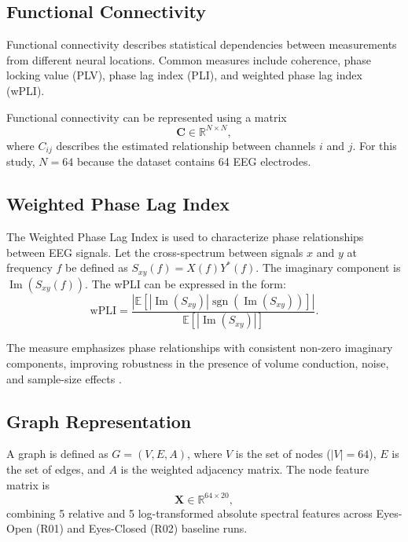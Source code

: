 \documentclass[conference]{IEEEtran}
\begin{document}
\subsection{Functional Connectivity}
Functional connectivity describes statistical dependencies between measurements from different neural locations. Common measures include coherence, phase locking value (PLV), phase lag index (PLI), and weighted phase lag index (wPLI).

Functional connectivity can be represented using a matrix
\begin{equation}
\mathbf{C} \in \mathbb{R}^{N \times N},
\end{equation}
where $C_{ij}$ describes the estimated relationship between channels $i$ and $j$. For this study, $N = 64$ because the dataset contains 64 EEG electrodes.

\subsection{Weighted Phase Lag Index}
The Weighted Phase Lag Index is used to characterize phase relationships between EEG signals. Let the cross-spectrum between signals $x$ and $y$ at frequency $f$ be defined as $S_{xy}(f) = X(f)Y^*(f)$. The imaginary component is $\operatorname{Im}(S_{xy}(f))$. The wPLI can be expressed in the form:
\begin{equation}
\text{wPLI} = \frac{|\mathbb{E}[|\operatorname{Im}(S_{xy})| \operatorname{sgn}(\operatorname{Im}(S_{xy}))]|}{\mathbb{E}[|\operatorname{Im}(S_{xy})|]}.
\end{equation}

The measure emphasizes phase relationships with consistent non-zero imaginary components, improving robustness in the presence of volume conduction, noise, and sample-size effects \cite{vinck2011}.

\subsection{Graph Representation}
A graph is defined as $G = (V, E, A)$, where $V$ is the set of nodes ($|V| = 64$), $E$ is the set of edges, and $A$ is the weighted adjacency matrix. The node feature matrix is
\begin{equation}
\mathbf{X} \in \mathbb{R}^{64 \times 20},
\end{equation}
combining 5 relative and 5 log-transformed absolute spectral features across Eyes-Open (R01) and Eyes-Closed (R02) baseline runs.
\end{document}

